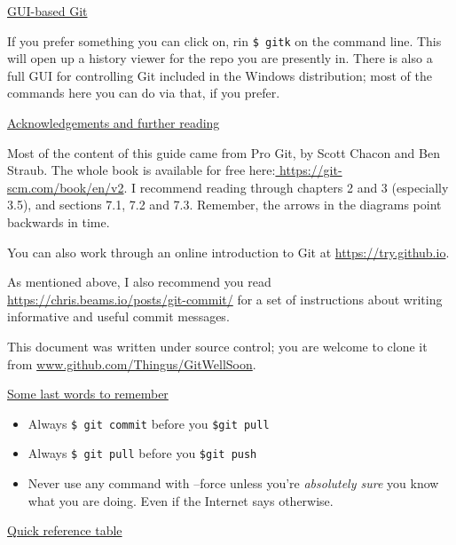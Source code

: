 \documentclass[11pt, a4paper, english]{article}
\begin{document}
\underline{GUI-based Git}

If you prefer something you can click on, rin \verb|$ gitk| on the command line. This will open up a history viewer for the repo you are presently in. There is also a full GUI for controlling Git included in the Windows distribution; most of the commands here you can do via that, if you prefer.

\underline{Acknowledgements and further reading}

Most of the content of this guide came from Pro Git, by Scott Chacon and Ben Straub. The whole book is available for free here:\url{ https://git-scm.com/book/en/v2}. I recommend reading through chapters 2 and 3 (especially 3.5), and sections 7.1, 7.2 and 7.3. Remember, the arrows in the diagrams point backwards in time.

You can also work through an online introduction to Git at \url{https://try.github.io}.

As mentioned above, I also recommend you read \url{https://chris.beams.io/posts/git-commit/} for a set of instructions about writing informative and useful commit messages.

This document was written under source control; you are welcome to clone it from \url{www.github.com/Thingus/GitWellSoon}.

\underline{Some last words to remember}

\begin{itemize}
\item Always \verb|$ git commit| before you \verb|$git pull|
\item Always \verb|$ git pull| before you \verb|$git push|
\item Never use any command with --force unless you're \textit{absolutely sure} you know what you are doing. Even if the Internet says otherwise.
\end{itemize}

\pagebreak
\underline{Quick reference table}
\end{document}
